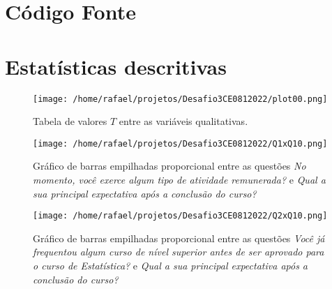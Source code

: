 \documentclass[
        a4paper,
        11pt,
        extrafontsizes,
        oneside,
        onecolumn,
        openright,
        final,
        article,
        brazil,
        sumario=tradicional
]{abntex2}
\begin{document}
\frenchspacing

\maketitle

\section{Código Fonte}



\section{Estatísticas descritivas}

\begin{figure}[htp]
\centering
\texttt{[image: /home/rafael/projetos/Desafio3CE0812022/plot00.png]}
\caption{Tabela de valores $T$ entre as variáveis qualitativas. }
\label{tabela}
\end{figure}

\begin{figure}[htp]
\centering
\texttt{[image: /home/rafael/projetos/Desafio3CE0812022/Q1xQ10.png]}
\caption{Gráfico de barras empilhadas proporcional entre as questões \emph{No momento, você exerce algum tipo de atividade remunerada?} e \emph{Qual a sua principal expectativa após a conclusão do curso?}}
\label{Q1xQ10}
\end{figure}

\begin{figure}[htp]
\centering
\texttt{[image: /home/rafael/projetos/Desafio3CE0812022/Q2xQ10.png]}
\caption{Gráfico de barras empilhadas proporcional entre as questões \emph{Você já frequentou algum curso de nível superior antes de ser aprovado para o curso de Estatística?} e \emph{Qual a sua principal expectativa após a conclusão do curso?}}
\label{Q5xQ6}
\end{figure}
\end{document}
